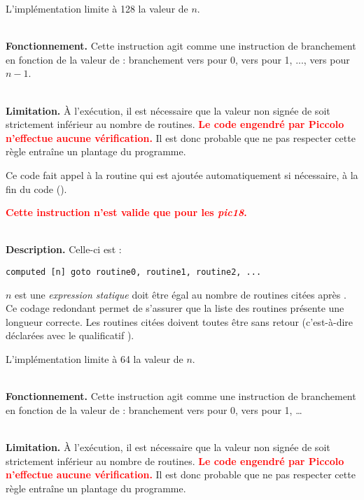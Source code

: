 L'implémentation limite à 128 la valeur de $n$.

~\\
\textbf{Fonctionnement.} Cette instruction agit comme une instruction de branchement en fonction de la valeur de  : branchement vers  pour 0, vers  pour 1, ..., vers  pour $n-1$. 

~\\
\textbf{Limitation.} À l'exécution, il est nécessaire que la valeur non signée de  soit strictement inférieur au nombre de routines. \textcolor{red}{\bf Le code engendré par Piccolo n'effectue aucune vérification.} Il est donc probable que ne pas respecter cette règle entraîne un plantage du programme.

Ce code fait appel à la routine  qui est ajoutée automatiquement si nécessaire, à la fin du code (). 




\textcolor{red}{\bf Cette instruction n'est valide que pour les \emph{pic18}.}

~\\
\textbf{Description.} Celle-ci est :
\begin{lstlisting}[language=piccolo]
computed [n] goto routine0, routine1, routine2, ...
\end{lstlisting}

$n$ est une \emph{expression statique} doit être égal au nombre de routines citées après . Ce codage redondant permet de s'assurer que la liste des routines présente une longueur correcte. Les routines citées doivent toutes être sans retour (c'est-à-dire déclarées avec le qualificatif ).

L'implémentation limite à 64 la valeur de $n$.

~\\
\textbf{Fonctionnement.} Cette instruction agit comme une instruction de branchement en fonction de la valeur de  : branchement vers  pour 0, vers  pour 1, \dots 

~\\
\textbf{Limitation.} À l'exécution, il est nécessaire que la valeur non signée de  soit strictement inférieur au nombre de routines. \textcolor{red}{\bf Le code engendré par Piccolo n'effectue aucune vérification.} Il est donc probable que ne pas respecter cette règle entraîne un plantage du programme.


